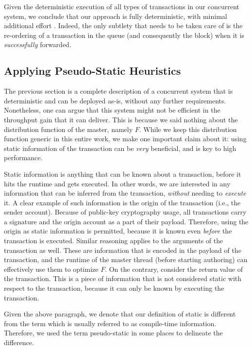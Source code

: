 Given the deterministic execution of all types of transactions in our concurrent system, we conclude
that our approach is fully deterministic, with minimal additional effort . Indeed, the only subtlety
that needs to be taken care of is the re-ordering of a transaction in the queue (and consequently
the block) when it is \textit{successfully} forwarded.


\subsection{Applying Pseudo-Static Heuristics} \label{subsec:applying_static_hints}

The previous section is a complete description of a concurrent system that is deterministic and can
be deployed as-is, without any further requirements. Nonetheless, one can argue that this system
might not be efficient in the throughput gain that it can deliver. This is because we said nothing
about the distribution function of the master, namely $F$. While we keep this distribution function
generic in this entire work, we make one important claim about it: using static information of the
transaction can be \textit{very} beneficial, and is key to high performance.

Static information is anything that can be known about a transaction, before it hits the runtime and
gets executed. In other words, we are interested in any information that can be inferred from the
transaction, \textit{without} needing to \textit{execute} it. A clear example of such information is
the origin of the transaction (i.e., the sender account). Because of public-key cryptography usage,
all transactions carry a signature and the origin account as a part of their payload. Therefore,
using the origin as static information is permitted, because it is known even \textit{before} the
transaction is executed. Similar reasoning applies to the arguments of the transaction as well.
These are information that is encoded in the payload of the transaction, and the runtime of the
master thread (before starting authoring) can effectively use them to optimize $F$. On the contrary,
consider the return value of the transaction. This is a piece of information that is not considered
static with respect to the transaction, because it can only be known by executing the transaction.

\begin{remark}
    Given the above paragraph, we denote that our definition of static is different from the term
    which is usually referred to as compile-time information. Therefore, we used the term
    pseudo-static in some places to delineate the difference.
\end{remark}

